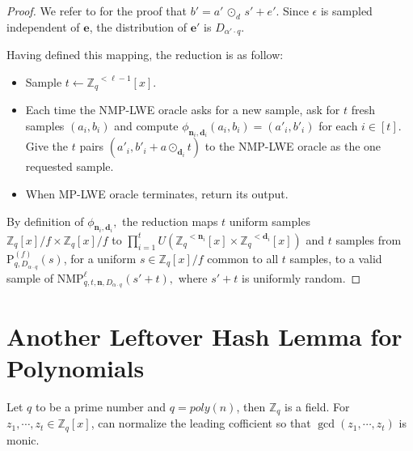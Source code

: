 \documentclass[11pt]{article}
\newcommand{\poly}[2]{{#1}^{<#2}[x]}
\newcommand{\Z}{\mathbb{Z}}
\newcommand{\middleProduct}[1]{\, \odot_{#1} \,}
\newcommand{\NMP}{\text{NMP}}
\begin{document}
\begin{proof}
We refer to \cite{MPLWE} for the proof that $b' = a'\middleProduct{d}s' + e'.$ Since $\epsilon$ is sampled independent of $\textbf{e}$, the distribution of $\textbf{e}'$ is $D_{\alpha'\cdot q}.$

Having defined this mapping, the reduction is as follow:
\begin{itemize}
    \item Sample $ t \leftarrow \poly{\Z_q}{\ell-1}.$
    \item Each time the NMP-LWE oracle asks for a new sample, ask for $t$ fresh samples $(a_i, b_i)$ and compute $\phi_{\textbf{n}_i, \textbf{d}_i} (a_i, b_i) = (a'_i, b'_i)$ for each $i \in [t].$ Give the $t$ pairs $(a'_i, b'_i + a \odot_{\textbf{d}_i} t)$ to the NMP-LWE oracle as the one requested sample.
    \item When MP-LWE oracle terminates, return its output.
\end{itemize}
By definition of $\phi_{\textbf{n}_i, \textbf{d}_i},$ the reduction maps $t$ uniform samples $\Z_q[x]/f \times \Z_q[x]/f $ to $\prod_{i=1}^t U(\poly{\Z_q}{\textbf{n}_i} \times \poly{\Z_q}{\textbf{d}_i}) $ and $t$ samples from $\text{P}^{(f)}_{q,D_{\alpha \cdot q}}(s)$, for a uniform $s \in \Z_q[x]/f$ common to all $t$ samples, to a valid sample of $\NMP^{\ell}_{q,t,\textbf{n},  D_{\alpha \cdot q}}(s'+t),$ where $s'+t$ is uniformly random.
\end{proof}
\section{Another Leftover Hash Lemma for Polynomials \label{sec:lhl}%
}
Let $q$ to be a prime number and $q= poly(n)$, then $\Z_q$ is a field. For $z_1, \cdots, z_t \in \mathbb{Z}_q[x]$, can normalize the leading cofficient so that $\gcd(z_1, \cdots, z_t)$ is monic. 
 
\end{document}

